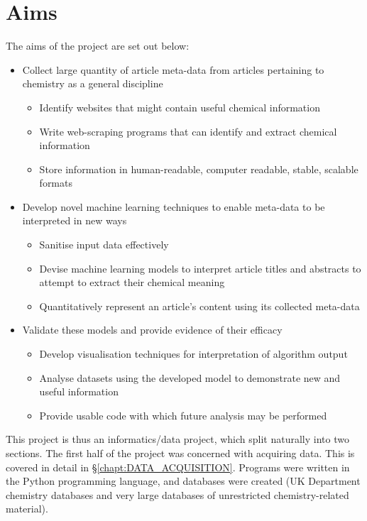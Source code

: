 \section{Aims}
The aims of the project are set out below:
\begin{itemize}
\itemsep-0.5em
\item Collect large quantity of article meta-data from articles pertaining to chemistry as a general discipline
\begin{itemize}
\itemsep-0.5em
\item Identify websites that might contain useful chemical information
\item Write web-scraping programs that can identify and extract chemical information
\item Store information in human-readable, computer readable, stable, scalable formats
\end{itemize}
\item Develop novel machine learning techniques to enable meta-data to be interpreted in new ways
\begin{itemize}
\itemsep-0.5em 
\item Sanitise input data effectively
\item Devise machine learning models to interpret article titles and abstracts to attempt to extract their chemical meaning
\item Quantitatively represent an article's content using its collected meta-data
\end{itemize}
\item Validate these models and provide evidence of their efficacy
\begin{itemize}
\itemsep-0.5em
\item Develop visualisation techniques for interpretation of algorithm output
\item Analyse datasets using the developed model to demonstrate new and useful information
\item Provide usable code with which future analysis may be performed
\end{itemize}
\end{itemize}
This project is thus an informatics/data project, which split naturally into two sections. The first half of the project was concerned with acquiring data. This is covered in detail in \S\ref{chapt:DATA_ACQUISITION}.
Programs were written in the Python programming language, and databases were created (UK Department chemistry databases and very large databases of unrestricted chemistry-related material).

